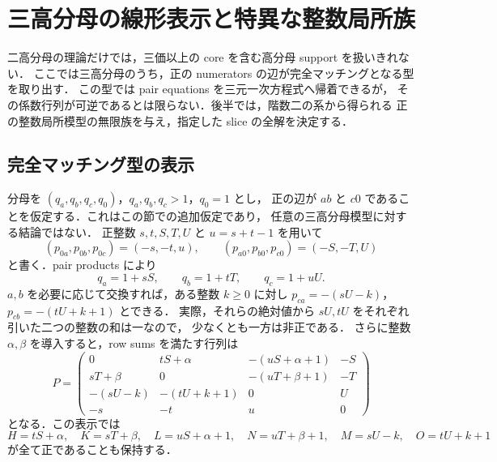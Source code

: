 \section{三高分母の線形表示と特異な整数局所族}
\label{sh14:section}

二高分母の理論だけでは，三価以上の core を含む高分母 support を扱いきれない．
ここでは三高分母のうち，正の numerators の辺が完全マッチングとなる型を取り出す．
この型では pair equations を三元一次方程式へ帰着できるが，
その係数行列が可逆であるとは限らない．後半では，階数二の系から得られる
正の整数局所模型の無限族を与え，指定した slice の全解を決定する．

\subsection{完全マッチング型の表示}
\label{sh14:matching-setup}

分母を $(q_a,q_b,q_c,q_0)$，$q_a,q_b,q_c>1$，$q_0=1$ とし，
正の辺が $ab$ と $c0$ であることを仮定する．これはこの節での追加仮定であり，
任意の三高分母模型に対する結論ではない．
正整数 $s,t,S,T,U$ と $u=s+t-1$ を用いて
\[
 (p_{0a},p_{0b},p_{0c})=(-s,-t,u),\qquad
 (p_{a0},p_{b0},p_{c0})=(-S,-T,U)
\]
と書く．pair products により
\[
 q_a=1+sS,\qquad q_b=1+tT,\qquad q_c=1+uU.
\]
$a,b$ を必要に応じて交換すれば，ある整数 $k\geq0$ に対し
$p_{ca}=-(sU-k)$，$p_{cb}=-(tU+k+1)$ とできる．
実際，それらの絶対値から $sU,tU$ をそれぞれ引いた二つの整数の和は一なので，
少なくとも一方は非正である．
さらに整数 $\alpha,\beta$ を導入すると，row sums を満たす行列は
\begin{equation}\label{sh14:matching-P}
 P=\begin{pmatrix}
 0&tS+\alpha&-(uS+\alpha+1)&-S\\
 sT+\beta&0&-(uT+\beta+1)&-T\\
 -(sU-k)&-(tU+k+1)&0&U\\
 -s&-t&u&0
 \end{pmatrix}
\end{equation}
となる．この表示では
\[
 H=tS+\alpha,\quad K=sT+\beta,\quad
 L=uS+\alpha+1,\quad N=uT+\beta+1,\quad
 M=sU-k,\quad O=tU+k+1
\]
が全て正であることも保持する．

